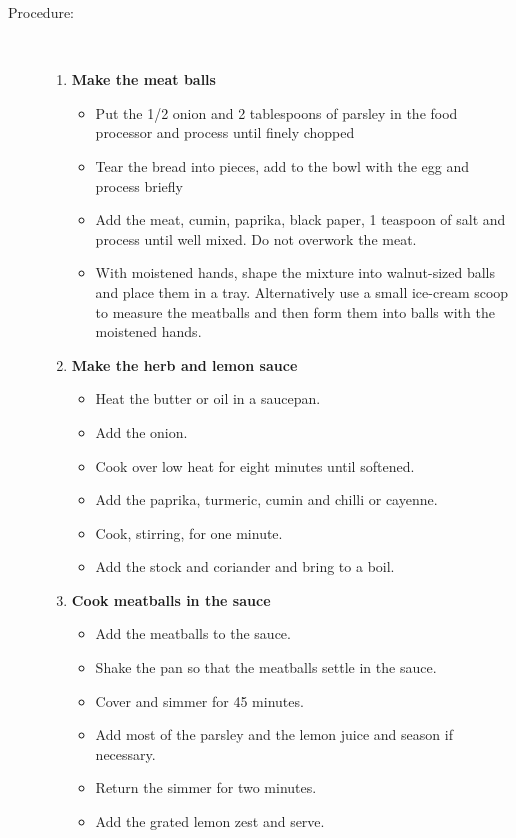 \documentclass[11pt,letterpaper]{article}
\begin{document}
\begin{description}
\item[Procedure:]\ \\
	\begin{enumerate}
	\item {\bf Make the meat balls}
	\begin{itemize}
	\item Put the 1/2 onion and 2 tablespoons of parsley  in the food processor and process until finely chopped
	\item Tear the bread into pieces, add to the bowl with the egg and process briefly
	\item Add the meat, cumin, paprika, black paper, 1 teaspoon of salt and process until well mixed. Do not overwork the meat.
	\item With moistened hands, shape the mixture into walnut-sized balls and place them in a tray. Alternatively use a small ice-cream scoop to measure the meatballs and then form them into balls with the moistened hands. 
	\end{itemize}
	\item {\bf Make the herb and lemon sauce}
	\begin{itemize}
	\item Heat the butter or oil in a saucepan.
	\item Add the onion.
	\item Cook over low heat for eight minutes until softened.
	\item Add the paprika, turmeric, cumin and chilli or cayenne.
	\item Cook, stirring, for one minute.
	\item Add the stock and coriander and bring to a boil.
	\end{itemize}
	\item{\bf Cook meatballs in the sauce}
	\begin{itemize}
	\item Add the meatballs to the sauce.
	\item Shake the pan so that the meatballs settle in the sauce.
	\item Cover and simmer for 45 minutes.
	\item Add most of the parsley and the lemon juice and season if necessary.
	\item Return the simmer for two minutes.
	\item Add the grated lemon zest and serve.
	\end{itemize}
	\end{enumerate}
\end{description}
\end{document}
